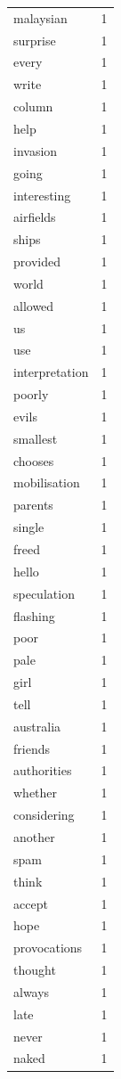\begin{tabular}{lr}
malaysian & 1 \\
surprise & 1 \\
every & 1 \\
write & 1 \\
column & 1 \\
help & 1 \\
invasion & 1 \\
going & 1 \\
interesting & 1 \\
airfields & 1 \\
ships & 1 \\
provided & 1 \\
world & 1 \\
allowed & 1 \\
us & 1 \\
use & 1 \\
interpretation & 1 \\
poorly & 1 \\
evils & 1 \\
smallest & 1 \\
chooses & 1 \\
mobilisation & 1 \\
parents & 1 \\
single & 1 \\
freed & 1 \\
hello & 1 \\
speculation & 1 \\
flashing & 1 \\
poor & 1 \\
pale & 1 \\
girl & 1 \\
tell & 1 \\
australia & 1 \\
friends & 1 \\
authorities & 1 \\
whether & 1 \\
considering & 1 \\
another & 1 \\
spam & 1 \\
think & 1 \\
accept & 1 \\
hope & 1 \\
provocations & 1 \\
thought & 1 \\
always & 1 \\
late & 1 \\
never & 1 \\
naked & 1 \\

\end{tabular}
